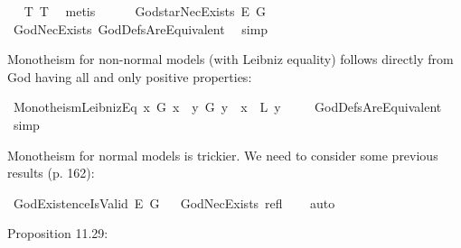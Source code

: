 \begin{isabellebody}
\isadelimproof
\ %
\endisadelimproof
%
\isatagproof
{}\isamarkupfalse%
\ T{}\ T{}\ \isamarkupfalse%
\ metis%
\endisatagproof
{\isafoldproof}%
%
\isadelimproof
%
\endisadelimproof
\ \ \ \ \isanewline
{}\isamarkupfalse%
\ God{\isacharunderscore}starNecExists{\isacharcolon}\ {\isachardoublequoteopen}{\isasymlfloor}\isactrlbold {\isasymbox}\isactrlbold {\isasymexists}\isactrlsup E\ G{\isacharasterisk}{\isasymrfloor}{\isachardoublequoteclose}\ \isanewline
%
\isadelimproof
\ \ %
\endisadelimproof
%
\isatagproof
{}\isamarkupfalse%
\ GodNecExists\ GodDefsAreEquivalent\ \isamarkupfalse%
\ simp%
\endisatagproof
{\isafoldproof}%
%
\isadelimproof
%
\endisadelimproof
%
\isamarkuptrue%
%
\begin{isamarkuptext}%
Monotheism for non-normal models (with Leibniz equality) follows directly from God having all and only positive properties:%
\end{isamarkuptext}\isamarkuptrue%
\isamarkupfalse%
\ Monotheism{\isacharunderscore}LeibnizEq{\isacharcolon}\ {\isachardoublequoteopen}{\isasymlfloor}\isactrlbold {\isasymforall}x{\isachardot}\ G\ x\ \isactrlbold {\isasymrightarrow}\ {\isacharparenleft}\isactrlbold {\isasymforall}y{\isachardot}\ G\ y\ \isactrlbold {\isasymrightarrow}\ {\isacharparenleft}x\ \ \isactrlbold {\isasymapprox}\isactrlsup L\ y{\isacharparenright}{\isacharparenright}{\isasymrfloor}{\isachardoublequoteclose}\ \isanewline
%
\isadelimproof
\ \ %
\endisadelimproof
%
\isatagproof
{}\isamarkupfalse%
\ GodDefsAreEquivalent\ \isamarkupfalse%
\ simp%
\endisatagproof
{\isafoldproof}%
%
\isadelimproof
%
\endisadelimproof
%
\begin{isamarkuptext}%
Monotheism for normal models is trickier. We need to consider some previous results (p. 162):%
\end{isamarkuptext}\isamarkuptrue%
\isamarkupfalse%
\ GodExistenceIsValid{\isacharcolon}\ {\isachardoublequoteopen}{\isasymlfloor}\isactrlbold {\isasymexists}\isactrlsup E\ G{\isasymrfloor}{\isachardoublequoteclose}%
\isadelimproof
\ %
\endisadelimproof
%
\isatagproof
{}\isamarkupfalse%
\ GodNecExists\ refl\isanewline
\ \ \isamarkupfalse%
\ auto\ %
%
\endisatagproof
{\isafoldproof}%
%
\isadelimproof
%
\endisadelimproof
%
\begin{isamarkuptext}%
Proposition 11.29:%

\end{isamarkuptext}
\end{isabellebody}
